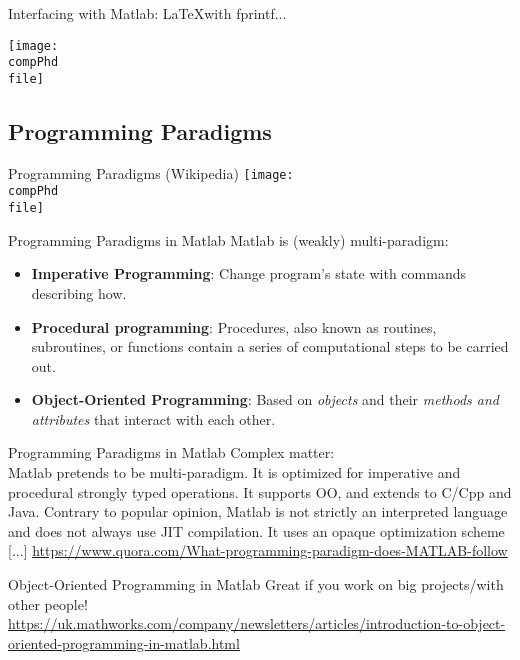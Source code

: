 \documentclass[]{beamer} %
\def\pathbase{/Users/pmxal9/} 	%
\def\pathbase{/Users/pmaal/} 	%
\edef\drop{\pathbase Dropbox/}		%
\edef\compPhd{\drop Nottingham/repos/phd/Seminars/+MatlabComputationalPhD/}
\begin{document}
\begin{frame}{Interfacing with Matlab: \LaTeX with fprintf...}
\def\file{interfacing/latex}
\begin{center}\texttt{[image: \\compPhd \\file]}\end{center}
\end{frame}


\subsection{Programming Paradigms}
\begin{frame}{Programming Paradigms (Wikipedia)}\centering
\def\file{progparadigm/1179px-Programming_paradigms.svg}
\texttt{[image: \\compPhd \\file]}
\end{frame}


\begin{frame}{Programming Paradigms in Matlab}
Matlab is (weakly) multi-paradigm:
\begin{itemize}
\item \textbf{Imperative Programming}: 
	Change program's state with commands describing how.
\item \textbf{Procedural programming}: 
	Procedures, also known as routines, subroutines, or functions contain a series of computational steps to be carried out.
\item \textbf{Object-Oriented Programming}: 
	Based on \textit{objects} and their \textit{methods and attributes} that interact with each other.
\end{itemize}
\end{frame}


\begin{frame}{Programming Paradigms in Matlab}
Complex matter:\\
\noindent[...] 
Matlab pretends to be multi-paradigm. It is optimized for imperative and procedural strongly typed operations. 
It supports OO, and extends to C/Cpp and Java. Contrary to popular opinion, Matlab is not strictly an interpreted language and 
does not always use JIT compilation. It uses an opaque optimization scheme 
[...]
\url{https://www.quora.com/What-programming-paradigm-does-MATLAB-follow}
\end{frame}

\begin{frame}{Object-Oriented Programming in Matlab}
Great if you work on big projects/with other people!\\
\url{https://uk.mathworks.com/company/newsletters/articles/introduction-to-object-oriented-programming-in-matlab.html}
\end{frame}
\end{document}
